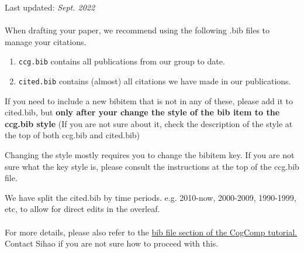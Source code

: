 \documentclass[11pt,a4paper]{article}
\begin{document}
Last updated: \textit{Sept. 2022}\\\\
When drafting your paper, we recommend using the following .bib files to manage your citations. \cite{DCLT19} 
\begin{enumerate}
    \item \texttt{ccg.bib} contains all publications from our group to date.
    \item \texttt{cited.bib} contains (almost) all citations we have made in our publications. 
\end{enumerate}

If you need to include a new bibitem that is not in any of these, please add it to cited.bib, but {\bf only after your change the style of the bib item to the ccg.bib style}
(If you are not sure about it, check the description of the style at the top of both ccg.bib and cited.bib)

Changing the style mostly requires you to change the bibitem key. If you are not sure what the key style is, please consult the instructions at the top of the ccg.bib file.

We have split the cited.bib by time periods. e.g. 2010-now, 2000-2009, 1990-1999, etc, to allow for direct edits in the overleaf. \\\\
For more details, please also refer to the \href{ https://docs.google.com/document/d/1I33aIJXMzIIaZQDHZzdpDEink5fKztU_VKFlbj-KzhA/edit#heading=h.k9gb5efodg4w}{\color{blue} bib file section of the CogComp tutorial. } \\

Contact Sihao if you are not sure how to proceed with this. 



\end{document}
